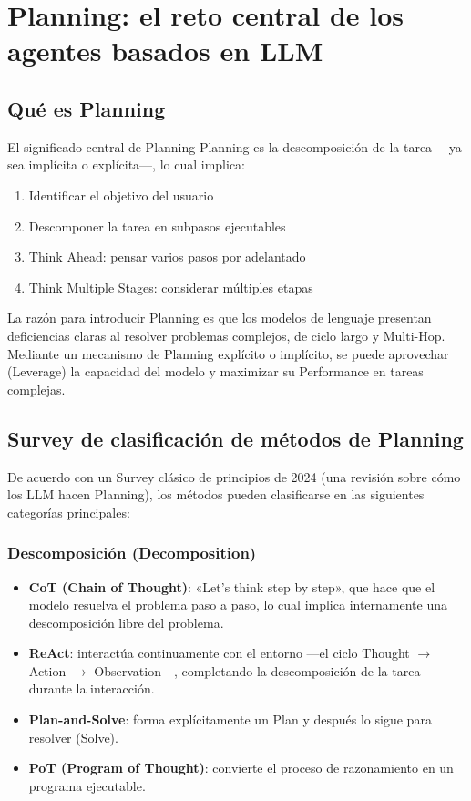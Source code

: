 \documentclass[a4paper]{article}
\begin{document}
\section{Planning: el reto central de los agentes basados en LLM}

\subsection{Qué es Planning}

\begin{importantbox}{El significado central de Planning}
Planning es la descomposición de la tarea —ya sea implícita o explícita—, lo cual implica:
\begin{enumerate}
    \item Identificar el objetivo del usuario
    \item Descomponer la tarea en subpasos ejecutables
    \item Think Ahead: pensar varios pasos por adelantado
    \item Think Multiple Stages: considerar múltiples etapas
\end{enumerate}
\end{importantbox}

La razón para introducir Planning es que los modelos de lenguaje presentan deficiencias claras al resolver problemas complejos, de ciclo largo y Multi-Hop. Mediante un mecanismo de Planning explícito o implícito, se puede aprovechar (Leverage) la capacidad del modelo y maximizar su Performance en tareas complejas.

\subsection{Survey de clasificación de métodos de Planning}

De acuerdo con un Survey clásico de principios de 2024 (una revisión sobre cómo los LLM hacen Planning), los métodos pueden clasificarse en las siguientes categorías principales:

\subsubsection{Descomposición (Decomposition)}

\begin{itemize}
    \item \textbf{CoT (Chain of Thought)}: «Let's think step by step», que hace que el modelo resuelva el problema paso a paso, lo cual implica internamente una descomposición libre del problema.
    \item \textbf{ReAct}: interactúa continuamente con el entorno —el ciclo Thought $\rightarrow$ Action $\rightarrow$ Observation—, completando la descomposición de la tarea durante la interacción.
    \item \textbf{Plan-and-Solve}: forma explícitamente un Plan y después lo sigue para resolver (Solve).
    \item \textbf{PoT (Program of Thought)}: convierte el proceso de razonamiento en un programa ejecutable.
\end{itemize}
\end{document}
